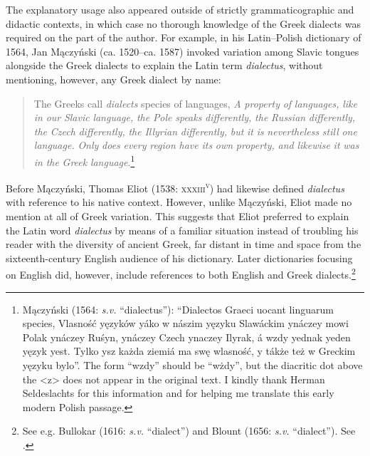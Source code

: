\documentclass[output=paper]{langsci/langscibook}
\begin{document}
The explanatory usage also appeared outside of strictly grammaticographic and didactic contexts, in which case no thorough knowledge of the Greek dialects was required on the part of the author. For example, in his Latin–Polish dictionary of 1564, Jan Mączyński (ca. 1520–ca. 1587) invoked variation among Slavic tongues alongside the Greek dialects to explain the Latin term \textit{dialectus}, without mentioning, however, any Greek dialect by name:

\begin{quote}
The Greeks call \textit{dialects} species of languages, \textit{A} \textit{property} \textit{of} \textit{languages,} \textit{like} \textit{in} \textit{our} \textit{Slavic} \textit{language,} \textit{the} \textit{Pole} \textit{speaks} \textit{differently,} \textit{the} \textit{Russian} \textit{differently,} \textit{the} \textit{Czech} \textit{differently,} \textit{the} \textit{Illyrian} \textit{differently,} \textit{but} \textit{it} \textit{is} \textit{nevertheless} \textit{still} \textit{one} \textit{language.} \textit{Only} \textit{does} \textit{every} \textit{region} \textit{have} \textit{its} \textit{own} \textit{property,} \textit{and} \textit{likewise} \textit{it} \textit{was} \textit{in} \textit{the} \textit{Greek} \textit{language}.\footnote{Mączyński (1564: \textit{s.v.} “dialectus”): “Dialectos Graeci uocant linguarum species, Vlasność yęzyków yáko w nászim yęzyku Slawáckim ynáczey mowi Polak ynáczey Ruśyn, ynáczey Czech ynaczey Ilyrak, á wzdy yednak yeden yęzyk yest. Tylko ysz każda ziemiá ma swę wlasność, y tákże też w Greckim yęzyku bylo”. The form “wzdy” should be “wżdy”, but the diacritic dot above the <z> does not appear in the original text. I kindly thank Herman Seldeslachts for this information and for helping me translate this early modern Polish passage.}
\end{quote}

Before Mączyński, Thomas Eliot (1538: \textsc{xxxiii}\textsc{\textsuperscript{v}}) had likewise defined \textit{dialectus} with reference to his native context. However, unlike Mączyński, Eliot made no mention at all of Greek variation. This suggests that Eliot preferred to explain the Latin word \textit{dialectus} by means of a familiar situation instead of troubling his reader with the diversity of ancient Greek, far distant in time and space from the sixteenth-century English audience of his dictionary. Later dictionaries focusing on English did, however, include references to both English and Greek dialects.\footnote{See e.g. Bullokar (1616: \textit{s.v.} “dialect”) and Blount (1656: \textit{s.v.} “dialect”). See \citet[7]{Blank1996}.}
\end{document}
